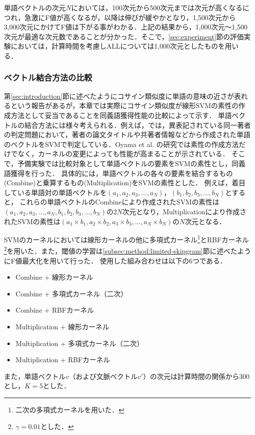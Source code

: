 \documentclass[japanese]{jnlp_1.4}
\begin{document}
単語ベクトルの次元$N$においては，100次元から500次元までは次元が高くなるにつれ，急激にF値が高くなるが，以降は伸びが緩やかとなり，1,500次元から3,000次元にかけてF値は下がる事がわかる．上記の結果から，1,000次元〜1,500次元が最適な次元数であることが分かった．そこで，\ref{sec:experiment}節の評価実験においては，計算時間を考慮しALLについては1,000次元としたものを用いる．


\subsubsection{ベクトル結合方法の比較}
\label{sec:pre-combine}

第\ref{sec:introduction}節に述べたようにコサイン類似度に単語の意味の近さが表れるという報告があるが，本章では実際にコサイン類似度が線形SVMの素性の作成方法として妥当であることを同義語獲得性能の比較によって示す．
単語ベクトルの結合方法には様々考えられる．例えば，\cite{oyama}では，異表記されている同一著者の判定問題において，著者の論文タイトルや共著者情報などから作成された単語のベクトルをSVMで判定している．Oyama et al. \cite{oyama}の研究では素性の作成方法だけでなく，カーネルの変更によっても性能が高まることが示されている．
そこで，予備実験では比較対象として単語ベクトルの要素をSVMの素性とし，同義語獲得を行った．
具体的には，単語ベクトルの各々の要素を結合するもの(Combine)と乗算するもの(Multiplication)をSVMの素性とした．
例えば，着目している単語対の単語ベクトルを$(a_1, a_2, a_3, ... , a_N)$，$(b_1, b_2, b_3, ... ,b_N)$とすると，
これらの単語ベクトルのCombineにより作成されたSVMの素性は$(a_1, a_2, a_3, ... , a_N, b_1, b_2, b_3, ... ,b_N)$の$2N$次元となり，Multiplicationにより作成されたSVMの素性は$(a_1 \times b_1, a_2 \times b_2, a_3 \times b_3, ... , a_N \times b_N)$の$N$次元となる．


SVMのカーネルにおいては線形カーネルの他に多項式カーネル\footnote{二次の多項式カーネルを用いた．}とRBFカーネル\footnote{$\gamma = 0.01$とした．}を用いた．また，閾値の学習は\ref{subsec:method:limited-skipgram}節に述べたようにF値最大化を用いて行った．
使用した組み合わせは以下の6つである．

\begin{itemize}
\item Combine + 線形カーネル
\item Combine + 多項式カーネル（二次）
\item Combine + RBFカーネル
\item Multiplication + 線形カーネル
\item Multiplication + 多項式カーネル（二次）
\item Multiplication + RBFカーネル
\end{itemize}
また，単語ベクトル$v$（および文脈ベクトル$v'$）の次元は計算時間の関係から300とし，$K=5$とした．
\end{document}
